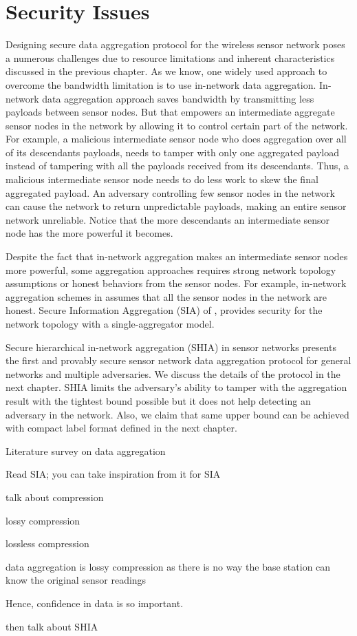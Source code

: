\section{Security Issues}
	Designing secure data aggregation protocol for the wireless sensor network poses a numerous challenges due to resource limitations and inherent characteristics discussed in the previous chapter. 
	As we know, one widely used approach to overcome the bandwidth limitation is to use in-network data aggregation.
	In-network data aggregation approach saves bandwidth by transmitting less payloads  between sensor nodes.
	But that empowers an intermediate aggregate sensor nodes in the network by allowing it to control certain part of the network.
	For example, a malicious intermediate sensor node who does aggregation over all of its descendants payloads, needs to tamper with only one aggregated payload instead of tampering with all the payloads received from its descendants. 
	Thus, a malicious intermediate sensor node needs to do less work to skew the final aggregated payload.
	An adversary controlling few sensor nodes in the network can cause the network to return unpredictable payloads, making an entire sensor network unreliable.
	Notice that the more descendants an intermediate sensor node has the more powerful it becomes.
	
	Despite the fact that in-network aggregation makes an intermediate sensor nodes more powerful, some aggregation approaches requires strong network topology assumptions or honest behaviors from the sensor nodes.
	For example, in-network aggregation schemes in \cite{yao2002cougar, madden2003design} assumes that all the sensor nodes in the network are honest. 
	Secure Information Aggregation (SIA) of \cite{przydatek2003sia}, provides security for the network topology with a single-aggregator model.  
	
	Secure hierarchical in-network aggregation (SHIA) in sensor networks \cite{chan2006secure} presents the first and provably secure sensor network data aggregation protocol for general networks and multiple adversaries. 
		We discuss the details of the protocol in the next chapter. 
	SHIA limits the adversary's ability to tamper with the aggregation result with the tightest bound possible but it does not help detecting an adversary in the network.
	Also, we claim that same upper bound can be achieved with compact label format defined in the next chapter.

Literature survey on data aggregation
	
	Read SIA; you can take inspiration from it for SIA

	talk about compression

	lossy compression

	lossless compression

	data aggregation is lossy compression as there is no way the base station can know the original sensor readings 

	Hence, confidence in data is so important.

then talk about SHIA